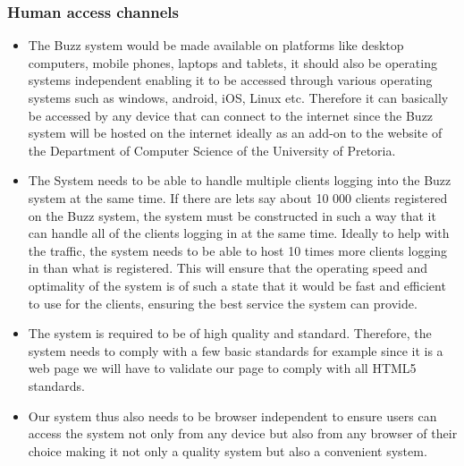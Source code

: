 \documentclass[a4paper]{article}
\begin{document}
\subsubsection{Human access channels }
\begin{itemize}
\item The Buzz system would be made available on platforms like desktop computers, mobile phones, laptops and tablets, it should also be operating systems independent enabling it to be accessed through various operating systems such as  windows, android, iOS, Linux etc. Therefore it can basically be accessed by any device that can connect to the internet since the Buzz system will be hosted on the internet ideally as an add-on to the website of the Department of Computer Science of the University of Pretoria. 
\item The System needs to be able to handle multiple clients logging into the Buzz system at the same time. If there are lets say about 10 000 clients registered on the Buzz system, the system must be constructed in such a way that it can handle all of the clients logging in at the same time. Ideally to help with the traffic, the system needs to be able to host 10 times more clients logging in than what is registered. This will ensure that the operating speed and optimality of the system is of such a state that it would be fast and efficient to use for the clients, ensuring the best service the system can provide.
\item The system is required to be of high quality and standard. Therefore, the system needs to comply with a few basic standards for example  since it is a web page we will have to validate our page to comply with all HTML5 standards. 
\item Our system thus also needs to be browser independent to ensure users can access the system not only from any device but also from any browser of their choice making it not only a quality system but also a convenient system.


\end{itemize}
\end{document}
